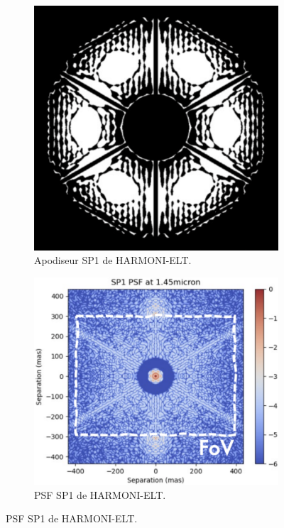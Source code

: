 \begin{figure}[htbp]
    \centering
    \begin{subfigure}[b]{0.40\textwidth}
        \centering
        \includegraphics[width=\textwidth]{figures/SP1_HARMONI.png}
        \caption{Apodiseur SP1 de HARMONI-ELT.}
    \end{subfigure}
    \hfill %
    \begin{subfigure}[b]{0.45\textwidth}
        \centering
        \includegraphics[width=\textwidth]{figures/PSF_SP1_HARMONI.png}
        \caption{PSF SP1 de HARMONI-ELT.}
    \end{subfigure}
    

\end{figure}
